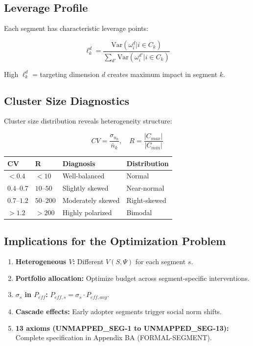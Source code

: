 \subsection{Leverage Profile}

Each segment has characteristic leverage points:

\begin{equation}
\boxed{
\ell_k^d = \frac{\text{Var}(\omega_i^d | i \in C_k)}{\sum_{d'} \text{Var}(\omega_i^{d'} | i \in C_k)}
}
\label{eq:mp-leverage}
\end{equation}

High $\ell_k^d$ = targeting dimension $d$ creates maximum impact in segment $k$.

\subsection{Cluster Size Diagnostics}

Cluster size distribution reveals heterogeneity structure:

\begin{equation}
CV = \frac{\sigma_{n_k}}{\bar{n}_k}, \quad R = \frac{|C_{max}|}{|C_{min}|}
\label{eq:mp-cluster-diagnostics}
\end{equation}

\begin{center}
\renewcommand{\arraystretch}{1.2}
\small
\begin{tabular}{@{}llll@{}}
\toprule
\textbf{CV} & \textbf{R} & \textbf{Diagnosis} & \textbf{Distribution} \\
\midrule
$< 0.4$ & $< 10$ & Well-balanced & Normal \\
$0.4$--$0.7$ & $10$--$50$ & Slightly skewed & Near-normal \\
$0.7$--$1.2$ & $50$--$200$ & Moderately skewed & Right-skewed \\
$> 1.2$ & $> 200$ & Highly polarized & Bimodal \\
\bottomrule
\end{tabular}
\end{center}

\subsection{Implications for the Optimization Problem}

\begin{enumerate}[nosep]
\item \textbf{Heterogeneous $V$:} Different $V(S, \Psi)$ for each segment $s$.
\item \textbf{Portfolio allocation:} Optimize budget across segment-specific interventions.
\item \textbf{$\sigma_s$ in $P_{eff}$:} $P_{eff,s} = \sigma_s \cdot P_{eff,avg}$.
\item \textbf{Cascade effects:} Early adopter segments trigger social norm shifts.
\item \textbf{13 axioms (UNMAPPED_SEG-1 to UNMAPPED_SEG-13):} Complete specification in Appendix BA (FORMAL-SEGMENT).
\end{enumerate}

